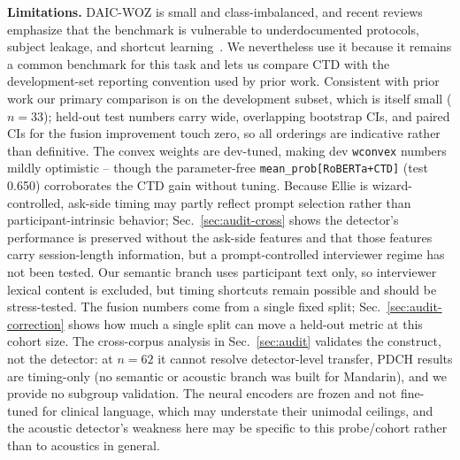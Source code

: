 \documentclass{article}
\begin{document}
\textbf{Limitations.} DAIC-WOZ is small and class-imbalanced, and recent reviews emphasize that the benchmark is vulnerable to underdocumented protocols, subject leakage, and shortcut learning~\cite{danylenko2026pitfalls}. We nevertheless use it because it remains a common benchmark for this task and lets us compare CTD with the development-set reporting convention used by prior work. Consistent with prior work our primary comparison is on the development subset, which is itself small ($n{=}33$); held-out test numbers carry wide, overlapping bootstrap CIs, and paired CIs for the fusion improvement touch zero, so all orderings are indicative rather than definitive. The convex weights are dev-tuned, making dev \texttt{wconvex} numbers mildly optimistic -- though the parameter-free \texttt{mean\_prob[RoBERTa+CTD]} (test 0.650) corroborates the CTD gain without tuning. Because Ellie is wizard-controlled, ask-side timing may partly reflect prompt selection rather than participant-intrinsic behavior; Sec.~\ref{sec:audit-cross} shows the detector's performance is preserved without the ask-side features and that those features carry session-length information, but a prompt-controlled interviewer regime has not been tested. Our semantic branch uses participant text only, so interviewer lexical content is excluded, but timing shortcuts remain possible and should be stress-tested. The fusion numbers come from a single fixed split; Sec.~\ref{sec:audit-correction} shows how much a single split can move a held-out metric at this cohort size. The cross-corpus analysis in Sec.~\ref{sec:audit} validates the construct, not the detector: at $n{=}62$ it cannot resolve detector-level transfer, PDCH results are timing-only (no semantic or acoustic branch was built for Mandarin), and we provide no subgroup validation. The neural encoders are frozen and not fine-tuned for clinical language, which may understate their unimodal ceilings, and the acoustic detector's weakness here may be specific to this probe/cohort rather than to acoustics in general.
\end{document}
